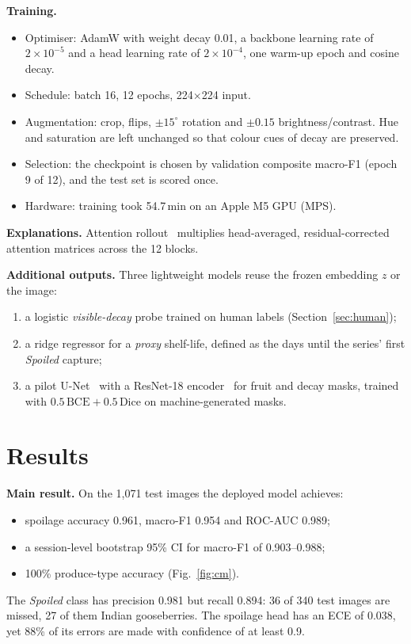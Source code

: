 \documentclass[conference]{IEEEtran}
\begin{document}
\textbf{Training.}
\begin{itemize}
\item Optimiser: AdamW with weight decay 0.01, a backbone learning rate of $2\times10^{-5}$ and a head learning rate of $2\times10^{-4}$, one warm-up epoch and cosine decay.
\item Schedule: batch 16, 12 epochs, 224$\times$224 input.
\item Augmentation: crop, flips, $\pm15^\circ$ rotation and $\pm0.15$ brightness/contrast. Hue and saturation are left unchanged so that colour cues of decay are preserved.
\item Selection: the checkpoint is chosen by validation composite macro-F1 (epoch 9 of 12), and the test set is scored once.
\item Hardware: training took 54.7\,min on an Apple M5 GPU (MPS).
\end{itemize}

\textbf{Explanations.} Attention rollout~\cite{rollout} multiplies head-averaged, residual-corrected attention matrices across the 12 blocks.

\textbf{Additional outputs.} Three lightweight models reuse the frozen embedding $z$ or the image:
\begin{enumerate}
\item a logistic \emph{visible-decay} probe trained on human labels (Section~\ref{sec:human});
\item a ridge regressor for a \emph{proxy} shelf-life, defined as the days until the series' first \emph{Spoiled} capture;
\item a pilot U-Net~\cite{unet} with a ResNet-18 encoder~\cite{resnet} for fruit and decay masks, trained with $0.5\,\mathrm{BCE}+0.5\,\mathrm{Dice}$ on machine-generated masks.
\end{enumerate}

\section{Results}
\textbf{Main result.} On the 1,071 test images the deployed model achieves:
\begin{itemize}
\item spoilage accuracy 0.961, macro-F1 0.954 and ROC-AUC 0.989;
\item a session-level bootstrap 95\% CI for macro-F1 of 0.903--0.988;
\item 100\% produce-type accuracy (Fig.~\ref{fig:cm}).
\end{itemize}
The \emph{Spoiled} class has precision 0.981 but recall 0.894: 36 of 340 test images are missed, 27 of them Indian gooseberries. The spoilage head has an ECE of 0.038, yet 88\% of its errors are made with confidence of at least 0.9.
\end{document}
